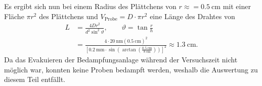 \documentclass[a4paper,twoside,final]{article}
\begin{document}
Es ergibt sich nun bei einem Radius des Plättchens von $r \approx = \SI{0.5}{\centi\metre}$ mit einer Fläche $\pi r^2$ des Plättchens und $V_\text{Probe} = D\cdot\pi r^2$ eine Länge des Drahtes von
\begin{align}
  L &= \frac{4 D r^2}{d^2 \sin^2 \vartheta}, \qquad \vartheta = \tan\frac{r}{h}\\
    &= \frac{4\cdot\SI{20}{\nano\metre} (\SI{0.5}{\centi\metre})^2}{[\SI{0.2}{\milli\metre}\cdot\sin(\arctan(\frac{\SI{0.5}{\centi\metre}}{\SI{8}{\centi\metre}}))]^2} \approx \SI{1.3}{\centi\metre}.
\end{align}
Da das Evakuieren der Bedampfungsanlage während der Versuchszeit nicht möglich war, konnten keine Proben bedampft werden, weshalb die Auswertung zu diesem Teil entfällt.
\captionsetup[subfigure]{justification=justified,singlelinecheck=false} %
\end{document}
